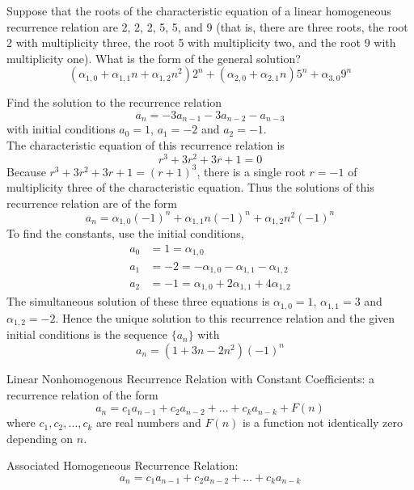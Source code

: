 \documentclass[12pt]{article}
\begin{document}
\begin{example} Suppose that the roots of the characteristic equation of a linear homogeneous recurrence relation are 2, 2, 2, 5, 5, and 9 (that is, there are three roots, the root 2 with multiplicity three, the root 5 with multiplicity two, and the root 9 with multiplicity one). What is the form of the general solution? 
$$(\alpha_{1, 0} + \alpha_{1, 1}n + \alpha_{1, 2}n^2)2^n + (\alpha_{2, 0} + \alpha_{2, 1}n)5^n + \alpha_{3, 0}9^n $$ \end{example} 

\begin{example} Find the solution to the recurrence relation $$a_n = -3a_{n - 1} - 3a_{n - 2} - a_{n - 3} $$ with initial conditions $a_0 = 1$, $a_1 = -2$ and $a_2 = -1$. \\ The characteristic equation of this recurrence relation is $$r^3 + 3r^2 + 3r + 1 = 0 $$ Because $r^3 + 3r^2 + 3r  + 1 = (r + 1)^3$, there is a single root $r = -1$ of multiplicity three of the characteristic equation. Thus the solutions of this recurrence relation are of the form $$a_n = \alpha_{1, 0}(-1)^n + \alpha_{1, 1}n(-1)^n + \alpha_{1, 2}n^2(-1)^n $$ To find the constants, use the initial conditions, $$\begin{aligned} a_0 &= 1 = \alpha_{1, 0} \\ a_1 &= -2 = -\alpha_{1, 0} - \alpha_{1, 1} - \alpha_{1, 2} \\ a_2 &= -1 = \alpha_{1, 0} + 2\alpha_{1, 1} + 4\alpha_{1, 2} \end{aligned} $$ 
The simultaneous solution of these three equations is $\alpha_{1, 0} = 1$, $\alpha_{1, 1} = 3$ and $\alpha_{1, 2} = -2$. Hence the unique solution to this recurrence relation and the given initial conditions is the sequence $\{a_n\}$ with $$a_n = (1 + 3n - 2n^2)(-1)^n $$ \end{example}

\begin{definition} Linear Nonhomogenous Recurrence Relation with Constant Coefficients: a recurrence relation of the form $$a_n = c_1a_{n - 1} + c_2a_{n - 2} + \dots + c_ka_{n - k} + F(n)$$ where $c_1, c_2, \dots, c_k$ are real numbers and $F(n)$ is a function not identically zero depending on $n$. \end{definition} 
\begin{definition} Associated Homogeneous Recurrence Relation: $$ a_n = c_1a_{n - 1} + c_2a_{n - 2} + \dots + c_ka_{n - k} $$ \end{definition}
\end{document}
